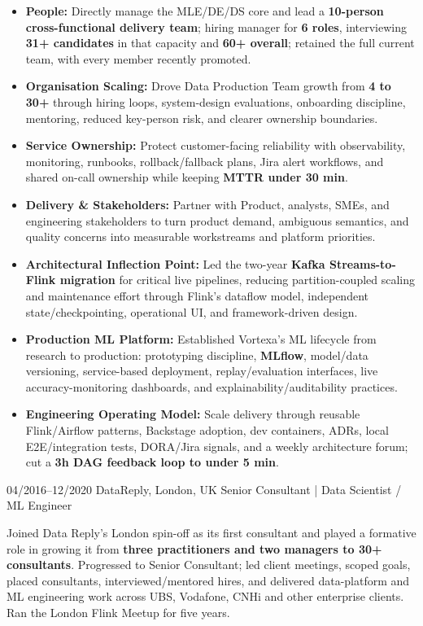 \documentclass[]{../../friggeri-cv}
\begin{document}
\begin{entrylist}
{{        }
        \begin{itemize}[leftmargin=1.1em]
            \item \footnotesize\textbf{People:} Directly manage the MLE/DE/DS core and lead a \textbf{10-person cross-functional delivery team}; hiring manager for \textbf{6 roles}, interviewing \textbf{31+ candidates} in that capacity and \textbf{60+ overall}; retained the full current team, with every member recently promoted.
            \item \footnotesize\textbf{Organisation Scaling:} Drove Data Production Team growth from \textbf{4 to 30+} through hiring loops, system-design evaluations, onboarding discipline, mentoring, reduced key-person risk, and clearer ownership boundaries.
            \item \footnotesize\textbf{Service Ownership:} Protect customer-facing reliability with observability, monitoring, runbooks, rollback/fallback plans, Jira alert workflows, and shared on-call ownership while keeping \textbf{MTTR under 30 min}.
            \item \footnotesize\textbf{Delivery \& Stakeholders:} Partner with Product, analysts, SMEs, and engineering stakeholders to turn product demand, ambiguous semantics, and quality concerns into measurable workstreams and platform priorities.
            \item \footnotesize\textbf{Architectural Inflection Point:} Led the two-year \textbf{Kafka Streams-to-Flink migration} for critical live pipelines, reducing partition-coupled scaling and maintenance effort through Flink's dataflow model, independent state/checkpointing, operational UI, and framework-driven design.
            \item \footnotesize\textbf{Production ML Platform:} Established Vortexa's ML lifecycle from research to production: prototyping discipline, \textbf{MLflow}, model/data versioning, service-based deployment, replay/evaluation interfaces, live accuracy-monitoring dashboards, and explainability/auditability practices.
            \item \footnotesize\textbf{Engineering Operating Model:} Scale delivery through reusable Flink/Airflow patterns, Backstage adoption, dev containers, ADRs, local E2E/integration tests, DORA/Jira signals, and a weekly architecture forum; cut a \textbf{3h DAG feedback loop to under 5 min}.
        \end{itemize}
    }
    \entry
    {04/2016--12/2020}
    {DataReply, London, UK}
    {Senior Consultant | Data Scientist / ML Engineer}
    {
        {\small
        \setlength{\parindent}{0pt}
        \setlength{\leftskip}{0pt}
        Joined Data Reply's London spin-off as its first consultant and played a formative role in growing it from \textbf{three practitioners and two managers to 30+ consultants}. Progressed to Senior Consultant; led client meetings, scoped goals, placed consultants, interviewed/mentored hires, and delivered data-platform and ML engineering work across UBS, Vodafone, CNHi and other enterprise clients. Ran the London Flink Meetup for five years.

}}
\end{entrylist}
\end{document}
